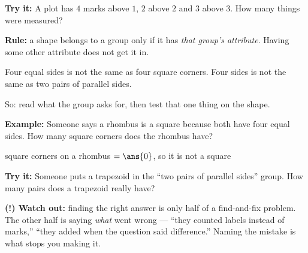 \documentclass[12pt]{article}
\begin{document}
\begin{tryitbox}
\textbf{Try it:} \quad A plot has $4$ marks above $1$, $2$ above $2$ and $3$ above $3$. How many
things were measured?\\[2pt]
\end{tryitbox}


\begin{formulabox}
\textbf{Rule:} a shape belongs to a group only if it has \emph{that group's attribute}. Having some
other attribute does not get it in.\par
Four equal sides is not the same as four square corners. \quad Four sides is not the same as two
pairs of parallel sides.\par
So: read what the group asks for, then test that one thing on the shape.
\end{formulabox}

\begin{examplebox}
\textbf{Example:} \quad Someone says a rhombus is a square because both have four equal sides. How
many square corners does the rhombus have?

square corners on a rhombus $= \ans{0}$, so it is not a square
\end{examplebox}

\begin{tryitbox}
\textbf{Try it:} \quad Someone puts a trapezoid in the ``two pairs of parallel sides'' group. How many
pairs does a trapezoid really have?\\[2pt]
\end{tryitbox}

\begin{watchoutbox}
\textbf{(!) Watch out:} finding the right answer is only half of a find-and-fix problem. The other
half is saying \emph{what} went wrong --- ``they counted labels instead of marks,'' ``they added when
the question said difference.'' Naming the mistake is what stops you making it.
\end{watchoutbox}
\end{document}
